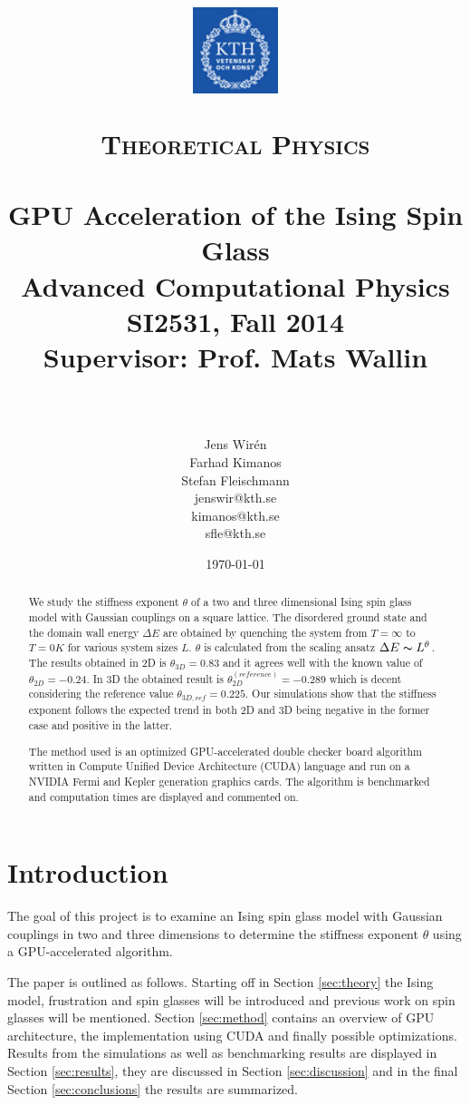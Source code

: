\documentclass[paper=a4, fontsize=11pt]{scrartcl} %
\title{
\vspace{-2.5cm}
\begin{center}
\includegraphics[width=2.5cm]{logo-kth.png}\\[-1mm]
\hspace{-3mm}
\end{center}
\normalfont \normalsize
\textsc{Theoretical Physics} \\ [25pt] %
\horrule{0.5pt} \\[0.4cm] %
\huge GPU Acceleration of the Ising Spin Glass \\ %
\Large Advanced Computational Physics\\ %
\Large SI2531, Fall 2014\\ %
\Large Supervisor: Prof. Mats Wallin \\ %
\horrule{2pt} \\[0.5cm] %
}
\author{Jens Wir\'{e}n \\
Farhad Kimanos \\
Stefan Fleischmann \\
\normalsize jenswir@kth.se \\
\normalsize kimanos@kth.se \\
\normalsize sfle@kth.se} %
\date{\normalsize\today} %
\numberwithin{equation}{section} %
\numberwithin{figure}{section} %
\numberwithin{table}{section} %
\begin{document}
\maketitle %


\begin{abstract}
We study the stiffness exponent $\theta$ of a two and three dimensional Ising spin glass model with Gaussian couplings on a square lattice. The disordered ground state and the domain wall energy $\Delta E$ are obtained by quenching the system from $T=\infty$ to $T=0 K$ for various system sizes $L$. $\theta$ is calculated from the scaling ansatz $\Delta E \thicksim L^\theta$. The results obtained in 2D is $\theta_{3D}=0.83$ and it agrees well with the known value of $\theta_{2D}=-0.24$. In 3D the obtained result is $\theta_{2D}^{(reference)}=-0.289$ which is decent considering the reference value $\theta_{3D,ref}=0.225$. Our simulations show that the stiffness exponent follows the expected trend in both 2D and 3D being negative in the former case and positive in the latter.

The method used is an optimized GPU-accelerated double checker board algorithm written in Compute Unified Device Architecture (CUDA) language and run on a NVIDIA Fermi and Kepler generation graphics cards. The algorithm is benchmarked and computation times are displayed and commented on. 
\end{abstract}

\pagebreak

\tableofcontents

\section{Introduction}

The goal of this project is to examine an Ising spin glass model with Gaussian couplings in two and three dimensions to determine the stiffness exponent $\theta$ using a GPU-accelerated algorithm.

The paper is outlined as follows. Starting off in Section \ref{sec:theory} the Ising model, frustration and spin glasses will be introduced and previous work on spin glasses will be mentioned. Section \ref{sec:method} contains an overview of GPU architecture, the implementation using CUDA and finally possible optimizations. Results from the simulations as well as benchmarking results are displayed in Section \ref{sec:results}, they are discussed in Section \ref{sec:discussion} and in the final Section \ref{sec:conclusions} the results are summarized.
\end{document}
